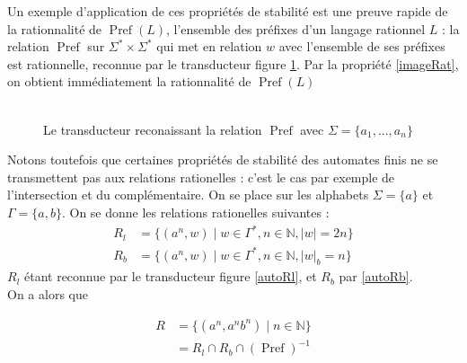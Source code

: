 \documentclass{scrartcl}
\begin{document}
\begin{flushleft}
Un exemple d'application de ces propriétés de stabilité est une preuve rapide de la rationnalité de $\operatorname*{Pref}(L)$, l'ensemble des préfixes
d'un langage rationnel $L$ : la relation $\operatorname*{Pref}$ sur $\Sigma^* \times \Sigma^*$ qui met en relation $w$ avec l'ensemble de
ses préfixes est rationnelle, reconnue par le transducteur figure \ref{transPref}. Par la propriété \ref{imageRat}, on obtient immédiatement la rationnalité de 
$\operatorname*{Pref}(L)$
\\~\\

\begin{figure}[h]
    \caption{Le transducteur reconaissant la relation $\operatorname*{Pref}$ avec $\Sigma = \{a_1, ..., a_n\}$} \label{transPref}
    \begin{center}
    \end{center}
\end{figure}

Notons toutefois que certaines propriétés de stabilité des automates finis ne se transmettent pas aux relations rationelles : c'est le cas par exemple
de l'intersection et du complémentaire. On se place sur les alphabets $\Sigma = \{a\}$ et $\Gamma = \{a, b\}$. On se donne les relations rationelles suivantes :
\begin{equation*}
    \begin{split}
        R_{l} &= \{ (a^n, w) \mid w \in \Gamma^*, n \in \mathbb{N}, |w| = 2n \}\\
        R_{b} &= \{ (a^n, w) \mid w \in \Gamma^*, n \in \mathbb{N}, |w|_b = n \} 
    \end{split}
\end{equation*}
$R_l$ étant reconnue par le transducteur figure \ref{autoRl}, et $R_b$ par \ref{autoRb}.\\
On a alors que

\begin{align*}
    R &= \{ (a^n, a^n b^n) \mid n \in \mathbb{N} \}\\
    &= R_l \cap R_b \cap (\operatorname*{Pref})^{-1}
\end{align*}


\end{flushleft}
\end{document}
